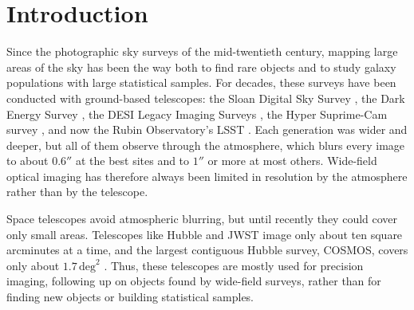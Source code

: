 \documentclass[linenumbers,trackchanges,twocolumn]{aastex701}
\begin{document}
\title{\lipsum[1]}

\author[orcid=0000-0000-0000-0001,sname='North America']{Tundra North America}


\section{Introduction}

Since the photographic sky surveys of the mid-twentieth century, mapping large areas of the sky has been the way both to find rare objects and to study galaxy populations with large statistical samples.
For decades, these surveys have been conducted with ground-based telescopes: the Sloan Digital Sky Survey \citep{York2000}, the Dark Energy Survey \citep{DES2016}, the DESI Legacy Imaging Surveys \citep{Dey2019}, the Hyper Suprime-Cam survey \citep{Aihara2018}, and now the Rubin Observatory's LSST \citep{Ivezic2019}.
Each generation was wider and deeper, but all of them observe through the atmosphere, which blurs every image to about $0.6''$ at the best sites and to $1''$ or more at most others.
Wide-field optical imaging has therefore always been limited in resolution by the atmosphere rather than by the telescope.

Space telescopes avoid atmospheric blurring, but until recently they could cover only small areas.
Telescopes like Hubble and JWST image only about ten square arcminutes at a time, and the largest contiguous Hubble survey, COSMOS, covers only about $1.7\,\mathrm{deg}^2$ \citep{Scoville2007COSMOS}.
Thus, these telescopes are mostly used for precision imaging, following up on objects found by wide-field surveys, rather than for finding new objects or building statistical samples.
\end{document}

